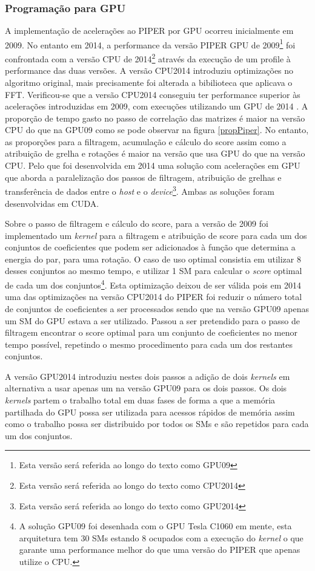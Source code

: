  \subsubsection{Programação para GPU}
 A implementação de acelerações ao PIPER\cite{piper2009gpu} por GPU ocorreu inicialmente em 2009. No entanto em 2014, a performance da versão PIPER GPU de 2009\footnote[5]{Esta versão será referida ao longo do texto como GPU09} foi confrontada com a versão CPU de 2014\footnote[6]{Esta versão será referida ao longo do texto como CPU2014} através da execução de um profile à performance das duas versões. A versão CPU2014 introduziu optimizações no algoritmo original, mais precisamente foi alterada a bibilioteca que aplicava o FFT. Verificou-se que a versão CPU2014 conseguiu ter performance superior às acelerações introduzidas em 2009, com execuções utilizando um GPU de 2014 \cite{piper2014gpu}. A proporção de tempo gasto no passo de correlação das matrizes é maior na versão CPU do que na GPU09 como se pode observar na figura \ref{propPiper}. No entanto, as proporções para a filtragem, acumulação e cálculo do score assim como a atribuição de grelha e rotações é maior na versão que usa GPU do que na versão CPU. Pelo que foi desenvolvida em 2014  uma solução com acelerações em GPU que aborda a paralelização dos passos de filtragem, atribuição de grelhas e transferência de dados entre o \textit{host} e o \textit{device}\footnote[7]{Esta versão será referida ao longo do texto como GPU2014}. Ambas as soluções foram desenvolvidas em CUDA. \par
 Sobre o passo de filtragem e cálculo do score, para a versão de 2009 foi implementado um \textit{kernel} para a filtragem e atribuição de score para cada um dos conjuntos de coeficientes que podem ser adicionados à função que determina a energia do par, para uma rotação. O caso de uso optimal consistia em utilizar 8 desses conjuntos ao mesmo tempo, e utilizar 1 SM para calcular o \textit{score} optimal de cada um dos conjuntos\footnote[8]{A solução GPU09 foi desenhada com o GPU Tesla C1060 em mente, esta arquitetura tem 30 SMs estando 8 ocupados com a execução do \textit{kernel} o que garante uma performance melhor do que uma versão do PIPER que apenas utilize o CPU.}. Esta optimização deixou de ser válida pois em 2014 uma das optimizações na versão CPU2014 do PIPER foi reduzir o número total de conjuntos de coeficientes a ser processados sendo que na versão GPU09 apenas um SM do GPU estava a ser utilizado. Passou a ser pretendido para o passo de filtragem encontrar o score optimal para um conjunto de coeficientes no menor tempo possível, repetindo o mesmo procedimento para cada um dos restantes conjuntos.\par A versão GPU2014 introduziu nestes dois passos a adição de dois \textit{kernels} em alternativa a usar apenas um na versão GPU09 para os dois passos. Os dois \textit{kernels} partem o trabalho total em duas fases de forma a que a memória partilhada do GPU possa ser utilizada para acessos rápidos de memória assim como o trabalho possa ser distribuido por todos os SMs e são repetidos para cada um dos conjuntos. \par

